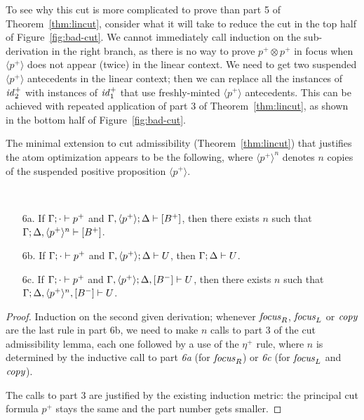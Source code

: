 To see why this cut is more complicated to prove than part 5 of 
Theorem~\ref{thm:lincut}, consider what it will take to reduce
the cut in the top half of Figure~\ref{fig:bad-cut}. We cannot immediately 
call induction on the sub-derivation in the right branch, as 
there is no way to prove $p^+ \otimes p^+$ in focus when 
$\langle p^+ \rangle$ does not appear (twice) in the linear context. 
We need to get two suspended $\langle p^+ \rangle$ antecedents
in the linear context; then we can replace all the instances of
${\it id}_2^+$ with instances of ${\it id}_1^+$ that use freshly-minted
$\langle p^+ \rangle$ antecedents. This can be achieved with 
repeated application of part 3 of Theorem~\ref{thm:lincut}, as shown
in the bottom half of Figure~\ref{fig:bad-cut}.

The minimal extension to cut admissibility (Theorem~\ref{thm:lincut})
that justifies the atom optimization appears to be the following,
where $\langle p^+ \rangle^n$ denotes $n$ copies of the suspended
positive proposition $\langle p^+ \rangle$.

\bigskip
\begin{theorem}
~
\begin{enumerate}
\item[6a.] 
  If ${\Gamma};{\cdot} \vdash {p^+} \mathstrut$ 
  and ${\Gamma, \langle p^+ \rangle};{\Delta} \vdash {[ B^+ ]} \mathstrut$, 
  then there exists $n$ such that
      ${\Gamma};{\Delta, \langle p^+ \rangle^n} \vdash {[ B^+ ]} \mathstrut$.
\item[6b.] 
  If ${\Gamma};{\cdot} \vdash {p^+} \mathstrut$
  and ${\Gamma, \langle p^+ \rangle};{\Delta} \vdash {U} \mathstrut$,
  then ${\Gamma};{\Delta} \vdash {U} \mathstrut$. 
\item[6c.]
  If ${\Gamma};{\cdot} \vdash {p^+} \mathstrut$
  and ${\Gamma, \langle p^+ \rangle};{\Delta, [B^-]} \vdash {U} \mathstrut$,
  then there exists $n$ such that
      ${\Gamma};{\Delta, \langle p^+ \rangle^n, [B^-]} \vdash {U} \mathstrut$.
\end{enumerate}
\end{theorem}

\begin{proof}
Induction on the second given derivation; whenever ${\it focus}_R$,
${\it focus}_L$ or ${\it copy}$ are the last rule in part 6b, we need
to make $n$ calls to part 3 of the cut admissibility lemma, each one
followed by a use of the $\eta^+$ rule, where
$n$ is determined by the inductive call to part {\it 6a} (for ${\it focus}_R$) 
or {\it 6c} (for ${\it focus}_L$ and ${\it copy}$). 

The calls to part 3 are justified by the existing induction metric: the 
principal cut formula $p^+$ stays the same and the part number gets smaller.
\end{proof}

